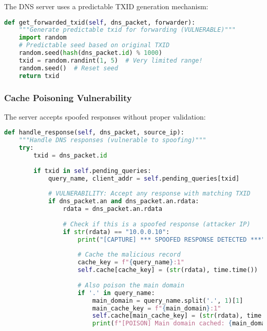 \documentclass[12pt,a4paper]{article}
\begin{document}
The DNS server uses a predictable TXID generation mechanism:

\begin{lstlisting}[language=python, caption=Vulnerable TXID Generation]
def get_forwarded_txid(self, dns_packet, forwarder):
    """Generate predictable txid for forwarding (VULNERABLE)"""
    import random
    # Predictable seed based on original TXID
    random.seed(hash(dns_packet.id) % 1000)
    txid = random.randint(1, 5)  # Very limited range!
    random.seed()  # Reset seed
    return txid
\end{lstlisting}

\subsubsection{Cache Poisoning Vulnerability}

The server accepts spoofed responses without proper validation:

\begin{lstlisting}[language=python, caption=Vulnerable Response Handling]
def handle_response(self, dns_packet, source_ip):
    """Handle DNS responses (vulnerable to spoofing)"""
    try:
        txid = dns_packet.id
        
        if txid in self.pending_queries:
            query_name, client_addr = self.pending_queries[txid]
            
            # VULNERABILITY: Accept any response with matching TXID
            if dns_packet.an and dns_packet.an.rdata:
                rdata = dns_packet.an.rdata
                
                # Check if this is a spoofed response (attacker IP)
                if str(rdata) == "10.0.0.10":
                    print("[CAPTURE] *** SPOOFED RESPONSE DETECTED ***")
                    
                    # Cache the malicious record
                    cache_key = f"{query_name}:1"
                    self.cache[cache_key] = (str(rdata), time.time())
                    
                    # Also poison the main domain
                    if '.' in query_name:
                        main_domain = query_name.split('.', 1)[1]
                        main_cache_key = f"{main_domain}:1"
                        self.cache[main_cache_key] = (str(rdata), time.time())
                        print(f"[POISON] Main domain cached: {main_domain} -> {rdata}")
\end{lstlisting}
\end{document}
